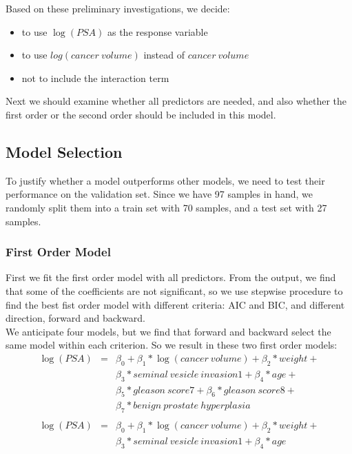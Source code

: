 \documentclass[12pt, letterpaper]{article}
\begin{document}
    Based on these preliminary investigations, we decide:

    \begin{itemize}

      \item to use $\log(PSA)$ as the response variable
      \item to use $log(cancer~volume)$ instead of $cancer~volume$
      \item not to include the interaction term

    \end{itemize}

    Next we should examine whether all predictors are needed, and also whether the first order or the second order should be included in this model.

  \subsection{Model Selection}

    To justify whether a model outperforms other models, we need to test their performance on the validation set. Since we have 97 samples in hand, we randomly split them into a train set with 70 samples, and a test set with 27 samples.

    \subsubsection{First Order Model}

      First we fit the first order model with all predictors. From the output, we find that some of the coefficients are not significant, so we use stepwise procedure to find the best fist order model with different criteria: AIC and BIC, and different direction, forward and backward.\\

      We anticipate four models, but we find that forward and backward select the same model within each criterion. So we result in these two first order models:
      \begin{eqnarray}
        \log(PSA) &=& \beta_0 + \beta_1 * \log(cancer~volume) + \beta_2 * weight + \nonumber\\
                   && \beta_3 * seminal~vesicle~invasion1 + \beta_4 * age + \nonumber\\
                   && \beta_5 * gleason~score7 +\beta_6 * gleason~score8 + \nonumber\\
                   && \beta_7 * benign~prostate~hyperplasia\\
                  &&\nonumber\\
       \log(PSA) &=& \beta_0 + \beta_1 * \log(cancer~volume) + \beta_2 * weight + \nonumber\\
                  && \beta_3 * seminal~vesicle~invasion1 + \beta_4 * age
      \end{eqnarray}
\end{document}

